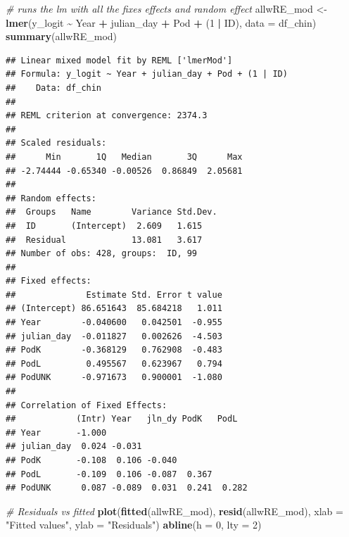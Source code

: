 \documentclass[
]{article}
\newenvironment{Shaded}{\begin{snugshade}}{\end{snugshade}}
\newcommand{\AttributeTok}[1]{\textcolor[rgb]{0.13,0.29,0.53}{#1}}
\newcommand{\CommentTok}[1]{\textcolor[rgb]{0.56,0.35,0.01}{\textit{#1}}}
\newcommand{\DecValTok}[1]{\textcolor[rgb]{0.00,0.00,0.81}{#1}}
\newcommand{\FunctionTok}[1]{\textcolor[rgb]{0.13,0.29,0.53}{\textbf{#1}}}
\newcommand{\NormalTok}[1]{#1}
\newcommand{\OtherTok}[1]{\textcolor[rgb]{0.56,0.35,0.01}{#1}}
\newcommand{\SpecialCharTok}[1]{\textcolor[rgb]{0.81,0.36,0.00}{\textbf{#1}}}
\newcommand{\StringTok}[1]{\textcolor[rgb]{0.31,0.60,0.02}{#1}}
\begin{document}
\begin{Shaded}
\begin{Highlighting}[]
\CommentTok{\# runs the lm with all the fixes effects and random effect}
\NormalTok{allwRE\_mod }\OtherTok{\textless{}{-}} \FunctionTok{lmer}\NormalTok{(y\_logit }\SpecialCharTok{\textasciitilde{}}\NormalTok{ Year }\SpecialCharTok{+}\NormalTok{ julian\_day }\SpecialCharTok{+}\NormalTok{ Pod }\SpecialCharTok{+}\NormalTok{ (}\DecValTok{1} \SpecialCharTok{|}\NormalTok{ ID), }\AttributeTok{data =}\NormalTok{ df\_chin)}
\FunctionTok{summary}\NormalTok{(allwRE\_mod)}
\end{Highlighting}
\end{Shaded}

\begin{verbatim}
## Linear mixed model fit by REML ['lmerMod']
## Formula: y_logit ~ Year + julian_day + Pod + (1 | ID)
##    Data: df_chin
## 
## REML criterion at convergence: 2374.3
## 
## Scaled residuals: 
##      Min       1Q   Median       3Q      Max 
## -2.74444 -0.65340 -0.00526  0.86849  2.05681 
## 
## Random effects:
##  Groups   Name        Variance Std.Dev.
##  ID       (Intercept)  2.609   1.615   
##  Residual             13.081   3.617   
## Number of obs: 428, groups:  ID, 99
## 
## Fixed effects:
##              Estimate Std. Error t value
## (Intercept) 86.651643  85.684218   1.011
## Year        -0.040600   0.042501  -0.955
## julian_day  -0.011827   0.002626  -4.503
## PodK        -0.368129   0.762908  -0.483
## PodL         0.495567   0.623967   0.794
## PodUNK      -0.971673   0.900001  -1.080
## 
## Correlation of Fixed Effects:
##            (Intr) Year   jln_dy PodK   PodL  
## Year       -1.000                            
## julian_day  0.024 -0.031                     
## PodK       -0.108  0.106 -0.040              
## PodL       -0.109  0.106 -0.087  0.367       
## PodUNK      0.087 -0.089  0.031  0.241  0.282
\end{verbatim}

\begin{Shaded}
\begin{Highlighting}[]
\CommentTok{\# Residuals vs fitted}
\FunctionTok{plot}\NormalTok{(}\FunctionTok{fitted}\NormalTok{(allwRE\_mod), }\FunctionTok{resid}\NormalTok{(allwRE\_mod),}
     \AttributeTok{xlab =} \StringTok{"Fitted values"}\NormalTok{, }\AttributeTok{ylab =} \StringTok{"Residuals"}\NormalTok{)}
\FunctionTok{abline}\NormalTok{(}\AttributeTok{h =} \DecValTok{0}\NormalTok{, }\AttributeTok{lty =} \DecValTok{2}\NormalTok{)}
\end{Highlighting}
\end{Shaded}
\end{document}
